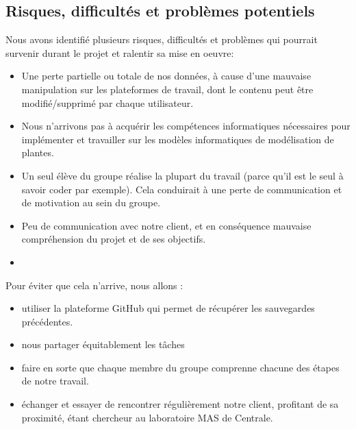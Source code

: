 

\subsection{Risques, difficultés et problèmes potentiels}
Nous avons identifié plusieurs risques, difficultés et problèmes qui pourrait survenir durant le projet et ralentir sa mise en oeuvre: 

\begin{itemize}
	\item Une perte partielle ou totale de nos données, à cause d'une mauvaise manipulation sur les plateformes de travail, dont le contenu peut être modifié/supprimé par chaque utilisateur.
	\item Nous n'arrivons pas à acquérir les compétences informatiques nécessaires pour implémenter et travailler sur les modèles informatiques de modélisation de plantes.
	\item Un seul élève du groupe réalise la plupart du travail (parce qu'il est le seul à savoir coder par exemple). Cela conduirait à une perte de communication et de motivation au sein du groupe.
	\item Peu de communication avec notre client, et en conséquence mauvaise compréhension du projet et de ses objectifs.
	\item 
\end{itemize}

Pour éviter que cela n'arrive, nous allons :
\begin{itemize}
	\item utiliser la plateforme GitHub qui permet de récupérer les sauvegardes précédentes.
	\item nous partager équitablement les tâches
	\item faire en sorte que chaque membre du groupe comprenne chacune des étapes de notre travail.
	\item échanger et essayer de rencontrer régulièrement notre client, profitant de sa proximité, étant chercheur au laboratoire MAS de Centrale.
\end{itemize}